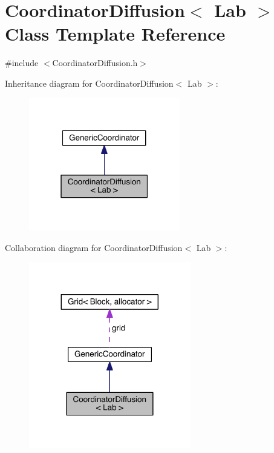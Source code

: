 \hypertarget{class_coordinator_diffusion}{}\section{Coordinator\+Diffusion$<$ Lab $>$ Class Template Reference}
\label{class_coordinator_diffusion}


{\ttfamily \#include $<$Coordinator\+Diffusion.\+h$>$}



Inheritance diagram for Coordinator\+Diffusion$<$ Lab $>$\+:\nopagebreak
\begin{figure}[H]
\begin{center}
\leavevmode
\includegraphics[width=187pt]{d5/db2/class_coordinator_diffusion__inherit__graph}
\end{center}
\end{figure}


Collaboration diagram for Coordinator\+Diffusion$<$ Lab $>$\+:\nopagebreak
\begin{figure}[H]
\begin{center}
\leavevmode
\includegraphics[width=200pt]{d5/d24/class_coordinator_diffusion__coll__graph}
\end{center}
\end{figure}

